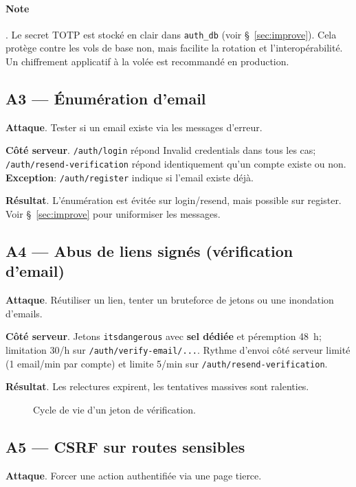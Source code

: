 \paragraph{Note}. Le secret TOTP est stocké en clair dans \texttt{auth\_db} (voir \S~\ref{sec:improve}). Cela protège contre les vols de base non, mais facilite la rotation et l'interopérabilité. Un chiffrement applicatif à la volée est recommandé en production.

\subsection*{A3 — Énumération d'email}
\textbf{Attaque}. Tester si un email existe via les messages d'erreur.

\textbf{Côté serveur}. \texttt{/auth/login} répond \og Invalid credentials \fg{} dans tous les cas; \texttt{/auth/resend-verification} répond identiquement qu'un compte existe ou non. \textbf{Exception}: \texttt{/auth/register} indique si l'email existe déjà.

\textbf{Résultat}. L'énumération est évitée sur login/resend, mais possible sur register. Voir \S~\ref{sec:improve} pour uniformiser les messages.

\subsection*{A4 — Abus de liens signés (vérification d'email)}
\textbf{Attaque}. Réutiliser un lien, tenter un bruteforce de jetons ou une inondation d'emails.

\textbf{Côté serveur}. Jetons \texttt{itsdangerous} avec \textbf{sel dédiée} et péremption 48~h; limitation 30/h sur \texttt{/auth/verify-email/...}. Rythme d'envoi côté serveur limité (1 email/min par compte) et limite 5/min sur \texttt{/auth/resend-verification}.

\textbf{Résultat}. Les relectures expirent, les tentatives massives sont ralenties.

\begin{figure}[h]
  \centering
  \caption{Cycle de vie d'un jeton de vérification.}
\end{figure}

\subsection*{A5 — CSRF sur routes sensibles}
\textbf{Attaque}. Forcer une action authentifiée via une page tierce.

